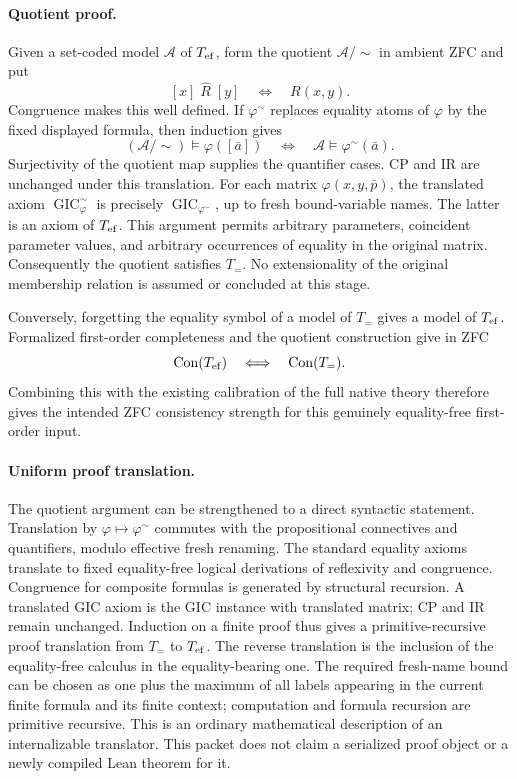 \paragraph{Quotient proof.}
Given a set-coded model $\mathcal A$ of $T_{\rm ef}$, form the quotient
$\mathcal A/{\sim}$ in ambient ZFC and put
\[
 [x]\;\widehat R\;[y]\quad\Longleftrightarrow\quad R(x,y).
\]
Congruence makes this well defined.  If $\varphi^\sim$ replaces equality
atoms of $\varphi$ by the fixed displayed formula, then induction gives
\[
 (\mathcal A/{\sim})\models\varphi([\bar a])
 \quad\Longleftrightarrow\quad
 \mathcal A\models\varphi^\sim(\bar a).
\]
Surjectivity of the quotient map supplies the quantifier cases.  CP and IR
are unchanged under this translation.  For each matrix $\varphi(x,y,\bar p)$,
the translated axiom $\operatorname{GIC}_{\varphi}^{\sim}$ is precisely
$\operatorname{GIC}_{\varphi^{\sim}}$, up to fresh bound-variable names.
The latter is an axiom of $T_{\rm ef}$.  This argument permits arbitrary
parameters, coincident parameter values, and arbitrary occurrences of
equality in the original matrix.  Consequently the quotient satisfies
$T_{=}$.  No extensionality of the original membership relation is assumed
or concluded at this stage.

Conversely, forgetting the equality symbol of a model of $T_{=}$ gives a
model of $T_{\rm ef}$.  Formalized first-order completeness and the quotient
construction give in ZFC
\[
 \operatorname{Con}(T_{\rm ef})
 \quad\Longleftrightarrow\quad
 \operatorname{Con}(T_{=}).
\]
Combining this with the existing calibration of the full native theory
therefore gives the intended ZFC consistency strength for this genuinely
equality-free first-order input.

\paragraph{Uniform proof translation.}
The quotient argument can be strengthened to a direct syntactic statement.
Translation by $\varphi\mapsto\varphi^\sim$ commutes with the propositional
connectives and quantifiers, modulo effective fresh renaming.  The standard
equality axioms translate to fixed equality-free logical derivations of
reflexivity and congruence.  Congruence for composite formulas is generated
by structural recursion.  A translated GIC axiom is the GIC instance with
translated matrix; CP and IR remain unchanged.  Induction on a finite proof
thus gives a primitive-recursive proof translation from $T_{=}$ to
$T_{\rm ef}$.  The reverse translation is the inclusion of the equality-free
calculus in the equality-bearing one.  The required fresh-name bound can
be chosen as one plus the maximum of all labels appearing in the current
finite formula and its finite context; computation and formula recursion
are primitive recursive.  This is an ordinary mathematical description of
an internalizable translator.  This packet does not claim a serialized
proof object or a newly compiled Lean theorem for it.

